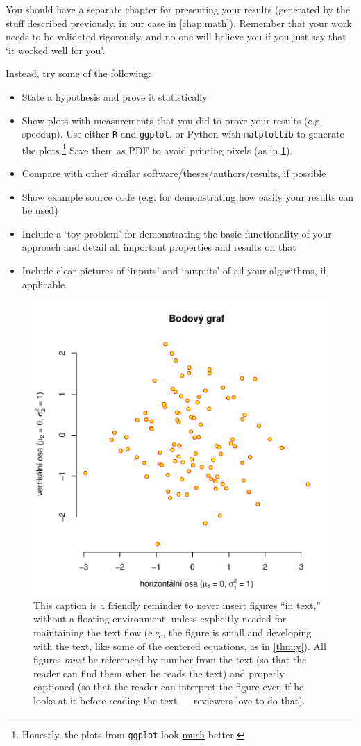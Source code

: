 You should have a separate chapter for presenting your results (generated by the stuff described previously, in our case in \cref{chap:math}). Remember that your work needs to be validated rigorously, and no one will believe you if you just say that `it worked well for you'.

Instead, try some of the following:
\begin{itemize}
\item State a hypothesis and prove it statistically
\item Show plots with measurements that you did to prove your results (e.g. speedup). Use either \texttt{R} and \texttt{ggplot}, or Python with \texttt{matplotlib} to generate the plots.\footnote{Honestly, the plots from \texttt{ggplot} look \underline{much} better.} Save them as PDF to avoid printing pixels (as in \cref{fig:f}).
\item Compare with other similar software/theses/authors/results, if possible
\item Show example source code (e.g. for demonstrating how easily your results can be used)
\item Include a `toy problem' for demonstrating the basic functionality of your approach and detail all important properties and results on that
\item Include clear pictures of `inputs' and `outputs' of all your algorithms, if applicable
\end{itemize}

\begin{figure}
\centering
\includegraphics[width=.6\linewidth]{img/ukazka-obr01.pdf}
\caption{This caption is a friendly reminder to never insert figures ``in text,'' without a floating environment, unless explicitly needed for maintaining the text flow (e.g., the figure is small and developing with the text, like some of the centered equations, as in \cref{thm:y}). All figures \emph{must} be referenced by number from the text (so that the reader can find them when he reads the text) and properly captioned (so that the reader can interpret the figure even if he looks at it before reading the text --- reviewers love to do that).}
\label{fig:f}
\end{figure}

